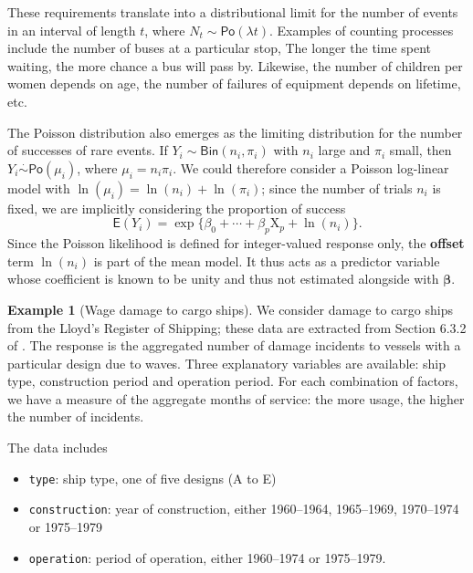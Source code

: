 \documentclass[
  11pt,
  letterpaper,
]{book}
\providecommand{\tightlist}{%
  \setlength{\itemsep}{0pt}\setlength{\parskip}{0pt}}
\theoremstyle{definition}
\theoremstyle{definition}
\newtheorem{example}{Example}[chapter]
\theoremstyle{definition}
\theoremstyle{definition}
\theoremstyle{remark}
\begin{document}
These requirements translate into a distributional limit for the number of events in an interval of length \(t\), where \(N_t \sim \mathsf{Po}(\lambda t)\).
Examples of counting processes include the number of buses at a particular stop,
The longer the time spent waiting, the more chance a bus will pass by. Likewise, the number of children per women depends on age, the number of failures of equipment depends on lifetime, etc.

The Poisson distribution also emerges as the limiting distribution for the number of successes of rare events. If \(Y_i \sim \mathsf{Bin}(n_i, \pi_i)\) with \(n_i\) large and \(\pi_i\) small, then \(Y_i \stackrel{\cdot}{\sim} \mathsf{Po}(\mu_i)\), where \(\mu_i = n_i\pi_i\). We could therefore consider a Poisson log-linear model with \(\ln(\mu_i)=\ln(n_i) + \ln(\pi_i)\); since the number of trials \(n_i\) is fixed, we are implicitly considering the proportion of success
\[\mathsf{E}\left( {Y_i}\right) = \exp\{\beta_0 + \cdots + \beta_p\mathrm{X}_p + \ln(n_i)\}.\]
Since the Poisson likelihood is defined for integer-valued response only, the \textbf{offset} term \(\ln(n_i)\) is part of the mean model. It thus acts as a predictor variable whose coefficient is known to be unity and thus not estimated alongside with \(\boldsymbol{\beta}\).

\begin{example}[Wage damage to cargo ships]
\protect\hypertarget{exm:waveoffset}{}{\label{exm:waveoffset} {} }We consider damage to cargo ships from the Lloyd's Register of Shipping; these data are extracted from Section 6.3.2 of \citet{McCullagh/Nelder:1989}. The response is the aggregated number of damage incidents to vessels with a particular design due to waves. Three explanatory variables are available: ship type, construction period and operation period. For each combination of factors, we have a measure of the aggregate months of service: the more usage, the higher the number of incidents.
\end{example}

The data includes

\begin{itemize}
\tightlist
\item
  \texttt{type}: ship type, one of five designs (A to E)
\item
  \texttt{construction}: year of construction, either 1960--1964, 1965--1969, 1970--1974 or 1975--1979
\item
  \texttt{operation}: period of operation, either 1960--1974 or 1975--1979.
\end{itemize}
\end{document}
